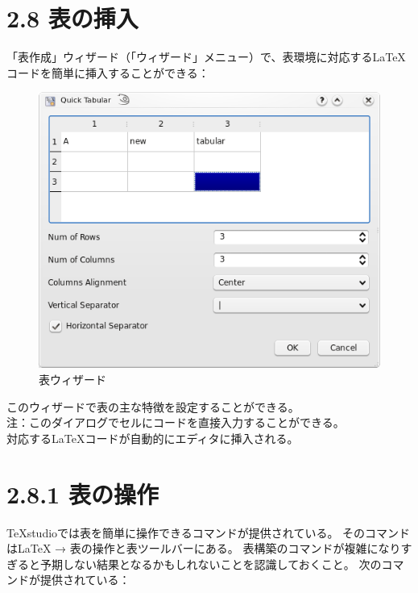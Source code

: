 \documentclass[]{book}
\makeatletter
\def\maxwidth{\ifdim\Gin@nat@width>\linewidth\linewidth
\else\Gin@nat@width\fi}
\let\Oldincludegraphics\includegraphics
\renewcommand{\includegraphics}[1]{\Oldincludegraphics[width=\maxwidth]{#1}}
\makeatother
\begin{document}
\section{2.8 表の挿入}

「表作成」ウィザード（「ウィザード」メニュー）で、表環境に対応するLaTeXコードを簡単に挿入することができる：

\begin{figure}[htbp]
\centering
\includegraphics{doc7.png}
\caption{表ウィザード}
\end{figure}

このウィザードで表の主な特徴を設定することができる。\\
注：このダイアログでセルにコードを直接入力することができる。\\
対応するLaTeXコードが自動的にエディタに挿入される。

\section{2.8.1 表の操作}

TeXstudioでは表を簡単に操作できるコマンドが提供されている。
そのコマンドはLaTeX → 表の操作と表ツールバーにある。
表構築のコマンドが複雑になりすぎると予期しない結果となるかもしれないことを認識しておくこと。
次のコマンドが提供されている：
\end{document}
